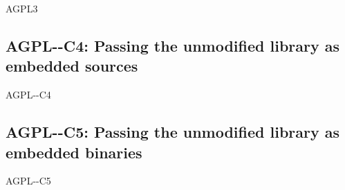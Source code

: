 \begin{license}{AGPL3}
\subsection{AGPL-\ver-C4: Passing the unmodified library as embedded sources}
\begin{lsuc}{AGPL-\ver-C4}
  \label{OSUC-07S-AGPL}

  \useCaseFour

  \begin{lsucrequires}
    \lsucmandatory{\keepLicenseElements}
    \lsucmandatory{\gplthreeEnsureCopyrightNoticeSource}
    \lsucmandatory{\giveLicense}\passingFilesCorrectly
    \lsucmandatory{\retainCopyrightNotices}
    \lsucmandatory{\addToCopyrightDialogLib}
    \lsucmandatory{\arrangeEnclosingSources}
    \lsucoptional{\addToDocumentation}
  \end{lsucrequires}

  \begin{lsucprohibits}
    \lsucitem{\noPatentLitigation}
  \end{lsucprohibits}
\end{lsuc}

\subsection{AGPL-\ver-C5: Passing the unmodified library as embedded binaries} 
\begin{lsuc}{AGPL-\ver-C5}
  \label{OSUC-07B-AGPL}

  \useCaseFive

  \begin{lsucrequires}
    \lsucmandatory{\keepLicenseElements}
    \lsucmandatory{\gplthreeEnsureCopyrightNoticeBinary}
    \lsucmandatory{\giveLicense}\passingFilesCorrectly
    \lsucmandatory{\makeAllSourcesAvailable}
    \lsucmandatory{\describeHowToGetSource}
    \lsucmandatory{\addToCopyrightDialogLib}
    \lsucmandatory{\arrangeEnclosingBinaries}
    \lsucmandatory{\retainCopyrightNotices}
    \lsucoptional{\addToDocumentation}
  \end{lsucrequires}

  \begin{lsucprohibits}
    \lsucitem{\noPatentLitigation}
  \end{lsucprohibits}
\end{lsuc}


\end{license}
